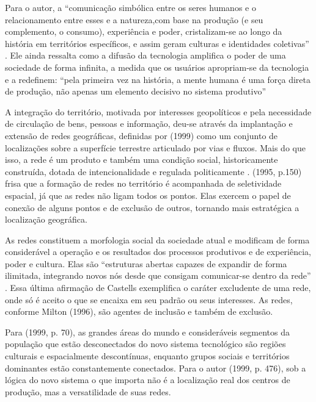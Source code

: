 Para o autor, a “comunicação simbólica entre os seres humanos e o relacionamento entre esses e a natureza,com base na produção (e seu complemento, o consumo), experiência e poder, cristalizam-se ao longo da história em territórios específicos, e assim geram culturas e identidades coletivas” \cite[p. 52-53]{castells1999}. Ele ainda ressalta como a difusão da tecnologia amplifica o poder de uma sociedade de forma infinita, a medida que os usuários apropriam-se da tecnologia e a redefinem: “pela primeira vez na história, a mente humana é uma força direta de produção, não apenas um elemento decisivo no sistema produtivo” \cite{castells1999}

A integração do território, motivada por interesses geopolíticos e pela necessidade de circulação de bens, pessoas e informação, deu-se através da implantação e extensão de redes geográficas, definidas por  (1999) como um conjunto de localizações sobre a superfície terrestre articulado por vias e fluxos. Mais do que isso, a rede é um produto e também uma condição social, historicamente construída, dotada de intencionalidade e regulada politicamente \cite{santos1996}.  (1995, p.150) frisa que a formação de redes no território é acompanhada de seletividade espacial, já que as redes não ligam todos os pontos. Elas exercem o papel de conexão de alguns pontos e de exclusão de outros, tornando mais estratégica a localização geográfica.

As redes constituem a morfologia social da sociedade atual e modificam de forma considerável a operação e os resultados dos processos produtivos e de experiência, poder e cultura. Elas são “estruturas abertas capazes de expandir de forma ilimitada, integrando novos nós desde que consigam comunicar-se dentro da rede” \cite[p. 566]{castells1999}. Essa última afirmação de Castells exemplifica o caráter excludente de uma rede, onde só é aceito o que se encaixa em seu padrão ou seus interesses. As redes, conforme Milton  (1996), são agentes de inclusão e também de exclusão.

Para  (1999, p. 70), as grandes áreas do mundo e consideráveis segmentos da população que estão desconectados do novo sistema tecnológico são regiões culturais e espacialmente descontínuas, enquanto grupos sociais e territórios dominantes estão constantemente conectados. Para o autor (1999, p. 476), sob a lógica do novo sistema o que importa não é a localização real dos centros de produção, mas a versatilidade de suas redes.

